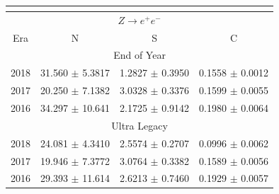 \begin{center}
 \begin{tabular}{ |c|c|c|c| }
 \multicolumn{4}{c}{                            } \\
 \hline
  \multicolumn{4}{|c|}{$Z\rightarrow e^{+}e^{-}$}\\
 \hline
 Era & N & S & C \\
 \hline
 \multicolumn{4}{|c|}{End of Year}\\
 \hline
 2018 & 31.560 $\pm$ 5.3817 & 1.2827 $\pm$ 0.3950 & 0.1558 $\pm$ 0.0012 \\
 2017 & 20.250 $\pm$ 7.1382 & 3.0328 $\pm$ 0.3376 & 0.1599 $\pm$ 0.0055 \\
 2016 & 34.297 $\pm$ 10.641 & 2.1725 $\pm$ 0.9142 & 0.1980 $\pm$ 0.0064 \\
 \hline
 \multicolumn{4}{|c|}{Ultra Legacy}\\
 \hline
 2018 & 24.081 $\pm$ 4.3410 & 2.5574 $\pm$ 0.2707 & 0.0996 $\pm$ 0.0062 \\
 2017 & 19.946 $\pm$ 7.3772 & 3.0764 $\pm$ 0.3382 & 0.1589 $\pm$ 0.0056 \\
 2016 & 29.393 $\pm$ 11.614 & 2.6213 $\pm$ 0.7460 & 0.1929 $\pm$ 0.0057 \\
\hline
\end{tabular}
\end{center}




